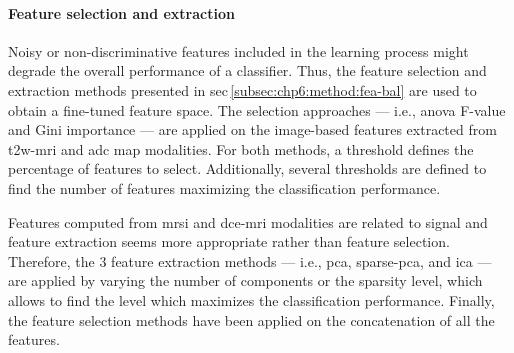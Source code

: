 \paragraph{Feature selection and extraction}

Noisy or non-discriminative features included in the learning process might degrade the overall performance of a classifier.
Thus, the feature selection and extraction methods presented in \acs{sec}\,\ref{subsec:chp6:method:fea-bal} are used to obtain a fine-tuned feature space.
The selection approaches --- i.e., \ac{anova} F-value and Gini importance --- are applied on the image-based features extracted from \ac{t2w}-\ac{mri} and \ac{adc} map modalities.
For both methods, a threshold defines the percentage of features to select.
Additionally, several thresholds are defined to find the number of features maximizing the classification performance.

Features computed from \ac{mrsi} and \ac{dce}-\ac{mri} modalities are related to signal and feature extraction seems more appropriate rather than feature selection.
Therefore, the 3 feature extraction methods --- i.e., \ac{pca}, sparse-\ac{pca}, and \ac{ica} --- are applied by varying the number of components or the sparsity level, which allows to find the level which maximizes the classification performance.
Finally, the feature selection methods have been applied on the concatenation of all the features.

